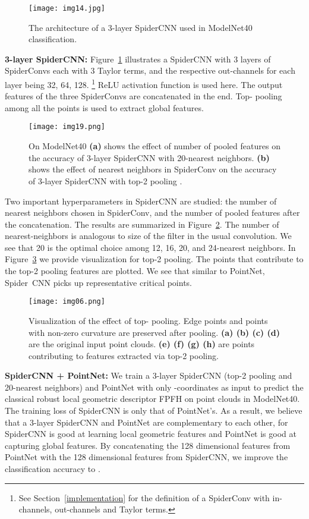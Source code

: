 \documentclass[runningheads]{llncs}
\begin{document}
\begin{figure}
\centering
\texttt{[image: img14.jpg]} 
\caption{The architecture of a 3-layer SpiderCNN used in ModelNet40 classification.}
\label{fig:spidercnn}
\end{figure}

{\noindent \bf 3-layer SpiderCNN: }
Figure~\ref{fig:spidercnn} illustrates a SpiderCNN with 3 layers of SpiderConvs each with 3 Taylor terms, and the respective out-channels for each layer being 32, 64, 128. 
\footnote{See Section~\ref{implementation} for the definition of a SpiderConv with  in-channels,  out-channels and  Taylor terms.} 
ReLU activation function is used here. The output features of the three SpiderConvs are concatenated in the end. Top- pooling among all the points is used to extract global features. 

\begin{figure}
\centering
\texttt{[image: img19.png]} 
\caption{
{On ModelNet40 \bf (a)} shows the effect of number of pooled features on the accuracy of 3-layer SpiderCNN with 20-nearest neighbors. 
{\bf (b)} shows the effect of nearest neighbors in SpiderConv on the accuracy of 3-layer SpiderCNN with top-2 pooling . 
}
\label{fig:spiderCNNhyper}
\end{figure}

Two important hyperparameters in SpiderCNN are studied: the number of nearest neighbors  chosen in SpiderConv, and the number of pooled features  after the concatenation. The results are summarized in Figure~\ref{fig:spiderCNNhyper}. The number of nearest-neighbors  is analogous to size of the filter in the usual convolution. We see that 20 is the optimal choice among 12, 16, 20, and 24-nearest neighbors.
In Figure~\ref{fig:topk1} we provide visualization for top-2 pooling. The points that contribute to the top-2 pooling features are plotted. We see that similar to PointNet, Spider~CNN picks up representative critical points. 

\begin{figure}
\centering
\texttt{[image: img06.png]} 
\caption{Visualization of the effect of top- pooling. Edge points and points with non-zero curvature are preserved after pooling.
{\bf (a) (b) (c) (d)} are the original input point clouds. 
{\bf (e) (f) (g) (h)} are points contributing to features extracted via top-2 pooling.
}
\label{fig:topk1}
\end{figure}

{\noindent \bf SpiderCNN + PointNet: }
We train a 3-layer SpiderCNN (top-2 pooling and 20-nearest neighbors) and PointNet with only -coordinates as input to predict the classical robust local geometric descriptor FPFH \cite{rusu2009fast} on point clouds in ModelNet40. The training loss of SpiderCNN is only  that of PointNet's.
As a result, we believe that a 3-layer SpiderCNN and PointNet are complementary to each other, for SpiderCNN is good at learning local geometric features and PointNet is good at capturing global features. By concatenating the 128 dimensional features from PointNet with the 128 dimensional features from SpiderCNN, we improve the classification accuracy to . 
\end{document}
